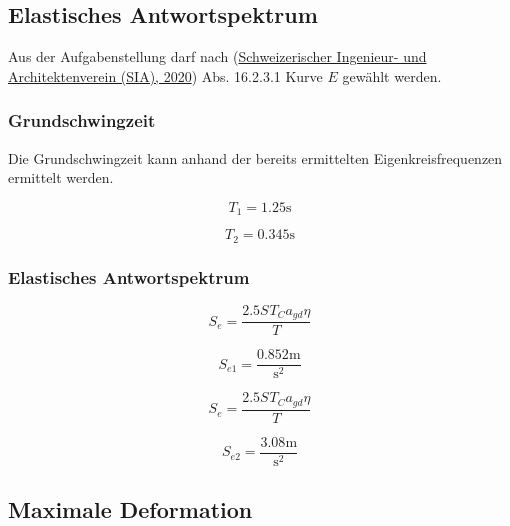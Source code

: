 \documentclass[
  letterpaper,
  DIV=11]{scrreprt}
\begin{document}
\hypertarget{elastisches-antwortspektrum-2}{%
\subsection{Elastisches
Antwortspektrum}\label{elastisches-antwortspektrum-2}}

Aus der Aufgabenstellung darf nach
(\protect\hyperlink{ref-SIA261_2020}{Schweizerischer Ingenieur- und
Architektenverein (SIA), 2020}) Abs. 16.2.3.1 Kurve \(E\) gewählt
werden.

\hypertarget{grundschwingzeit-1}{%
\subsubsection{Grundschwingzeit}\label{grundschwingzeit-1}}

Die Grundschwingzeit kann anhand der bereits ermittelten
Eigenkreisfrequenzen ermittelt werden.

\begin{equation*}T_{1} = 1.25 \text{s}\end{equation*}

\begin{equation*}T_{2} = 0.345 \text{s}\end{equation*}

\hypertarget{elastisches-antwortspektrum-3}{%
\subsubsection{Elastisches
Antwortspektrum}\label{elastisches-antwortspektrum-3}}

\begin{equation*}S_{e} = \frac{2.5 S_{} T_{C} a_{gd} \eta}{T}\end{equation*}

\begin{equation*}S_{e 1} = \frac{0.852 \text{m}}{\text{s}^{2}}\end{equation*}

\begin{equation*}S_{e} = \frac{2.5 S_{} T_{C} a_{gd} \eta}{T}\end{equation*}

\begin{equation*}S_{e 2} = \frac{3.08 \text{m}}{\text{s}^{2}}\end{equation*}

\hypertarget{maximale-deformation}{%
\subsection{Maximale Deformation}\label{maximale-deformation}}
\end{document}
